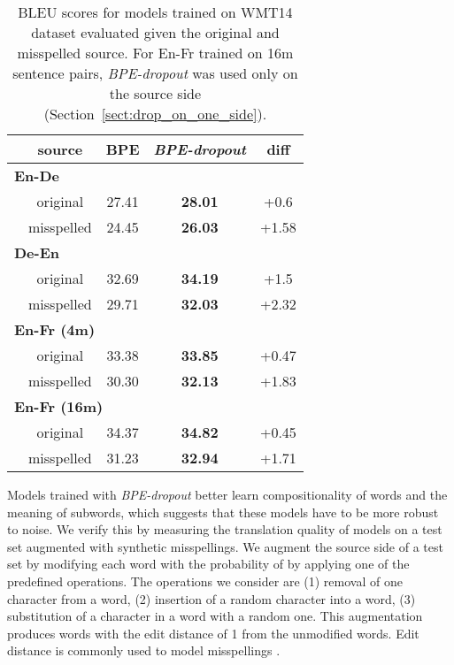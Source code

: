 \documentclass[11pt,a4paper]{article}
\begin{document}
\begin{table}[t!]
\centering
\begin{tabular}{lcccc}
\toprule
 & source & BPE & \textit{BPE-dropout} & diff\\

\midrule
\multicolumn{5}{l}{\!\!\!\bf En-De}\\
&original & 27.41 & \bf{28.01} & +0.6 \\
&misspelled & 24.45 & \bf{26.03} & +1.58\\
\midrule
\multicolumn{5}{l}{\!\!\!\bf De-En}\\
&\!\!\!\!\!\!  original & 32.69 & \bf{34.19} & +1.5\\
&\!\!\!\!\!\!  misspelled & 29.71 & \bf{32.03} & +2.32\\
\midrule
\multicolumn{5}{l}{\!\!\!\bf En-Fr (4m)}\\
&\!\!\!\!\!\!  original & 33.38 & \bf{33.85} & +0.47\\
&\!\!\!\!\!\!  misspelled & 30.30 & \bf{32.13} & +1.83 \\
\midrule
\multicolumn{5}{l}{\!\!\!\bf En-Fr (16m)}\\
&\!\!\!\!\!\!  original & 34.37 & \bf{34.82} & +0.45\\
&\!\!\!\!\!\!  misspelled & 31.23 & \bf{32.94} & +1.71 \\
\bottomrule
\end{tabular}
\caption{BLEU scores for models trained on WMT14 dataset evaluated given the original and misspelled source. For En-Fr trained on 16m sentence pairs, \textit{BPE-dropout} was used only on the source side (Section~\ref{sect:drop_on_one_side}).}
\label{tab:misspell}

\end{table}

Models trained with \textit{BPE-dropout} better learn compositionality of words and the meaning of subwords, which suggests that these models have to be more robust to noise. We verify this by measuring the translation quality of models on a test set augmented with synthetic misspellings.
We augment the source side of a test set by modifying each word with the probability of  by applying one of the predefined operations. The operations we consider are (1) removal of one character from a word, (2) insertion of a random character into a word, (3) substitution of a character in a word with a random one. This augmentation produces words with the edit distance of 1 from the unmodified words. Edit distance is commonly used to model misspellings \cite{misspell2,misspell1,pinter-etal-2017-mimicking}.
\end{document}
